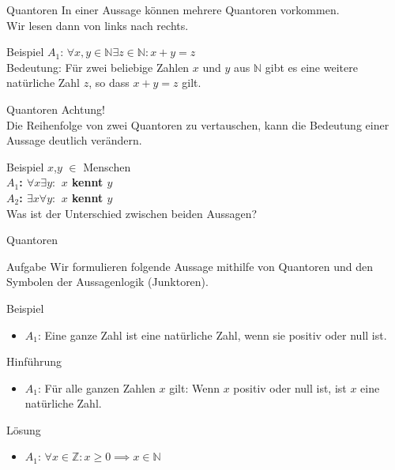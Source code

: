 \begin{frame}[fragile]{Quantoren}
    In einer Aussage können mehrere Quantoren vorkommen.\\
    Wir lesen dann von links nach rechts.
    \begin{exampleblock}{Beispiel}
        $A_1$: $\forall x,y \in \mathbb{N} \exists z \in \mathbb{N}: x+y = z$\\
        Bedeutung: Für zwei beliebige Zahlen $x$ und $y$ aus $\mathbb{N}$ gibt es eine weitere natürliche Zahl $z$, so dass $x+y=z$ gilt.
    \end{exampleblock}
\end{frame}

\begin{frame}[fragile]{Quantoren}
    \alert{Achtung!}\\
    Die Reihenfolge von zwei Quantoren zu vertauschen, kann die Bedeutung einer Aussage deutlich verändern.
    \begin{exampleblock}{Beispiel}
        $x$,$y$ $\in$ Menschen\\
        \textbf{$A_1$: $\forall x \exists y:$ $x$ kennt $y$\\
            $A_2$: $\exists x \forall y:$ $x$ kennt $y$\\ }
        Was ist der Unterschied zwischen beiden Aussagen?
    \end{exampleblock}
\end{frame}

\begin{frame}{Quantoren}
    \begin{alertblock}{Aufgabe}
        Wir formulieren folgende Aussage mithilfe von Quantoren und den Symbolen der Aussagenlogik (Junktoren).
    \end{alertblock}
    \begin{block}{Beispiel}
        \begin{itemize}
            \item $A_1$: Eine ganze Zahl ist eine natürliche Zahl, wenn sie positiv oder null ist.
        \end{itemize}
    \end{block}
    \begin{block}{Hinführung}
        \begin{itemize}
            \item $A_1$: Für alle ganzen Zahlen $x$ gilt: Wenn $x$ positiv oder null ist, ist $x$ eine natürliche Zahl.
        \end{itemize}
    \end{block}
    \begin{block}{\alert{Lösung}}
        \begin{itemize}
            \item $A_1$: $\forall x \in \mathbb{Z}: x \geq 0 \implies x \in \mathbb{N}$
        \end{itemize}
    \end{block}
\end{frame}

